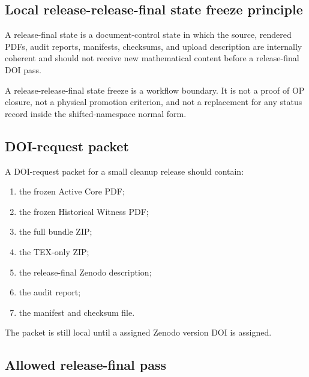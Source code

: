\subsection{Local release-release-final state freeze principle}
\label{subsec:v4015-local-release-release-final state-freeze-principle}

\begin{definition}
\label{def:v4015-local-release-release-final state-freeze-principle}
A release-final state is a document-control state in which the
source, rendered PDFs, audit reports, manifests, checksums, and upload
description are internally coherent and should not receive new mathematical
content before a release-final DOI pass.
\end{definition}

\begin{remark}
\label{rem:v4015-freeze-not-mathematical-closure}
A release-release-final state freeze is a workflow boundary. It is not a proof of OP
closure, not a physical promotion criterion, and not a replacement for any
status record inside the shifted-namespace normal form.
\end{remark}

\subsection{DOI-request packet}
\label{subsec:v4015-doi-request-packet}

\begin{definition}
\label{def:v4015-doi-request-packet}
A DOI-request packet for a small cleanup release should contain:
\begin{enumerate}[leftmargin=*]
 \item the frozen Active Core PDF;
 \item the frozen Historical Witness PDF;
 \item the full bundle ZIP;
 \item the TEX-only ZIP;
 \item the release-final Zenodo description;
 \item the audit report;
 \item the manifest and checksum file.
\end{enumerate}
The packet is still local until a assigned Zenodo version DOI is assigned.
\end{definition}

\subsection{Allowed release-final pass}
\label{subsec:v4015-allowed-release-final-pass}

